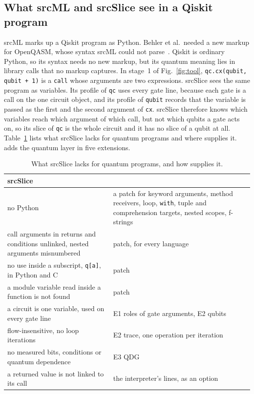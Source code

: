 \subsection{What srcML and srcSlice see in a Qiskit program}
srcML marks up a Qiskit program as Python. Behler et al.\ needed a new markup for OpenQASM, whose syntax
srcML could not parse~\cite{behler2024supporting}. Qiskit is ordinary Python, so its syntax needs no new
markup, but its quantum meaning lies in library calls that no markup captures. In stage~1 of
Fig.~\ref{fig:tool}, \texttt{qc.cx(qubit, qubit + 1)} is a \texttt{call} whose arguments are two
expressions. srcSlice sees the same program as variables. Its profile of \texttt{qc} uses every gate line,
because each gate is a call on the one circuit object, and its profile of \texttt{qubit} records that the
variable is passed as the first and the second argument of \texttt{cx}. srcSlice therefore knows which
variables reach which argument of which call, but not which qubits a gate acts on, so its slice of
\texttt{qc} is the whole circuit and it has no slice of a qubit at all. Table~\ref{tab:flaws} lists what
srcSlice lacks for quantum programs and where \tool{} supplies it. \tool{} adds the quantum layer in five
extensions.

\begin{table}[t]
  \centering
  \caption{What srcSlice lacks for quantum programs, and how \tool{} supplies it.}
  \label{tab:flaws}
  \footnotesize\setlength{\tabcolsep}{3pt}
  \begin{tabular}{@{}p{} p{}@{}}
    \toprule
    srcSlice & \tool{} \\
    \midrule
    no Python & a patch for keyword arguments, method receivers, loop, \texttt{with}, tuple and comprehension
    targets, nested scopes, f-strings \\
    call arguments in returns and conditions unlinked, nested arguments misnumbered & patch, for every
    language \\
    no use inside a subscript, \texttt{q[a]}, in Python and C & patch \\
    a module variable read inside a function is not found & patch \\
    a circuit is one variable, used on every gate line & E1 roles of gate arguments, E2 qubits \\
    flow-insensitive, no loop iterations & E2 trace, one operation per iteration \\
    no measured bits, conditions or quantum dependence & E3 QDG \\
    a returned value is not linked to its call & the interpreter's lines, as an option \\
    \bottomrule
  \end{tabular}
\end{table}



